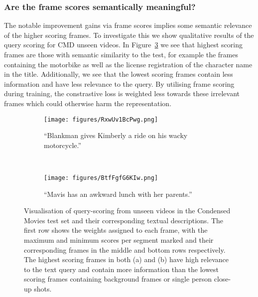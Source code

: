 \subsubsection{Are the frame scores semantically meaningful?} The notable improvement gains via frame scores implies some semantic relevance of the higher scoring frames. To investigate this we show qualitative results of the query scoring for CMD unseen videos. In Figure~\ref{fig:query_scoring_qual} we see that highest scoring frames are those with semantic similarity to the test, for example the frames containing the motorbike as well as the license registration of the character name in the title. Additionally, we see that the lowest scoring frames contain less information and have less relevance to the query. By utilising frame scoring during training, the constrastive loss is weighted less towards these irrelevant frames which could otherwise harm the representation.

\begin{figure}[!t]
\centering
\begin{subfigure}{0.95\textwidth}
    \centering
    \texttt{[image: figures/RxwUv1BcPwg.png]}
    \label{fig:motorbike}
    \caption{``Blankman gives Kimberly a ride on his wacky motorcycle.''}
\end{subfigure}\\
\begin{subfigure}{0.95\textwidth}
    \centering
    \texttt{[image: figures/BtfFgfG6KIw.png]}
    \label{fig:parents}
    \caption{``Mavis has an awkward lunch with her parents.''}
\end{subfigure}
\caption{\small{Visualisation of query-scoring from unseen videos in the Condensed Movies test set and their corresponding textual descriptions. The first row shows the weights assigned to each frame, with the maximum and minimum scores per segment marked and their corresponding frames in the middle and bottom rows respectively. The highest scoring frames in both (a) and (b) have high relevance to the text query and contain more information than the lowest scoring frames containing background frames or single person close-up shots.}}
\label{fig:query_scoring_qual}
\vspace{-0.8em}
\end{figure}


